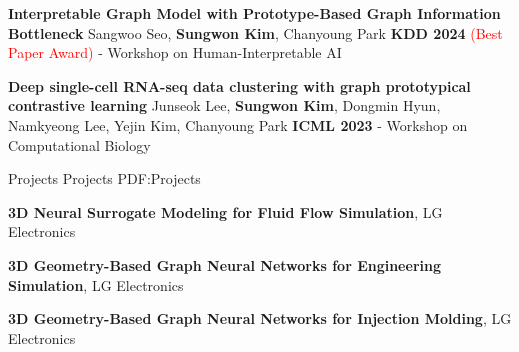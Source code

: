 \documentclass[letterpaper,MMMyyyy,nonstopmode]{simpleresumecv}
\begin{document}
\begin{Body}
\Gap
\NumberedItem{[W2]}
\textbf{Interpretable Graph Model with Prototype-Based Graph Information Bottleneck}
\newline
Sangwoo Seo, \textbf{Sungwon Kim}, Chanyoung Park
\newline
\textbf{KDD 2024} \textcolor{red}{(Best Paper Award)} - Workshop on Human-Interpretable AI

\Gap
\NumberedItem{[W1]}
\textbf{Deep single-cell RNA-seq data clustering with graph prototypical contrastive learning}
\newline
Junseok Lee, \textbf{Sungwon Kim}, Dongmin Hyun, Namkyeong Lee, Yejin Kim, Chanyoung Park
\newline
\textbf{ICML 2023} - Workshop on Computational Biology

\endgroup








\Section
{Projects}
{Projects}
{PDF:Projects}


\BulletItem
\textbf{3D Neural Surrogate Modeling for Fluid Flow Simulation}, LG Electronics
\hfill
{}

\Gap
\BulletItem
\textbf{3D Geometry-Based Graph Neural Networks for Engineering Simulation}, LG Electronics
\hfill
{}

\Gap
\BulletItem
\textbf{3D Geometry-Based Graph Neural Networks for Injection Molding}, LG Electronics
\hfill
{}


\end{Body}
\end{document}
